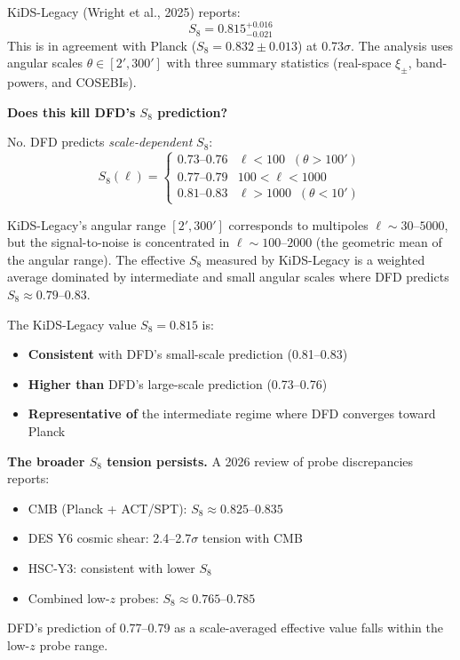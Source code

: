 \documentclass[11pt,a4paper]{article}
\begin{document}
\begin{tcolorbox}[colback=blue!3!white, colframe=blue!60!black,
  title=\textbf{Finding \thesection: DFD's scale-dependent $S_8$
  prediction survives KiDS-Legacy}\label{find:s8}]

KiDS-Legacy (Wright et al., 2025) reports:
\begin{equation}
S_8 = 0.815^{+0.016}_{-0.021}
\end{equation}
This is in agreement with Planck ($S_8 = 0.832 \pm 0.013$) at
0.73$\sigma$. The analysis uses angular scales $\theta \in [2', 300']$
with three summary statistics (real-space $\xi_\pm$, band-powers, and
COSEBIs).

\textbf{Does this kill DFD's $S_8$ prediction?}

No. DFD predicts \emph{scale-dependent} $S_8$:
\begin{equation}
S_8(\ell) = \begin{cases}
0.73\text{--}0.76 & \ell < 100 \;\; (\theta > 100') \\
0.77\text{--}0.79 & 100 < \ell < 1000 \\
0.81\text{--}0.83 & \ell > 1000 \;\; (\theta < 10')
\end{cases}
\end{equation}

KiDS-Legacy's angular range $[2', 300']$ corresponds to multipoles
$\ell \sim 30$--$5000$, but the signal-to-noise is concentrated in
$\ell \sim 100$--$2000$ (the geometric mean of the angular range).
The effective $S_8$ measured by KiDS-Legacy is a weighted average
dominated by intermediate and small angular scales where DFD predicts
$S_8 \approx 0.79$--$0.83$.

The KiDS-Legacy value $S_8 = 0.815$ is:
\begin{itemize}[nosep]
\item \textbf{Consistent} with DFD's small-scale prediction (0.81--0.83)
\item \textbf{Higher than} DFD's large-scale prediction (0.73--0.76)
\item \textbf{Representative of} the intermediate regime where DFD
  converges toward Planck
\end{itemize}

\textbf{The broader $S_8$ tension persists.} A 2026 review of probe
discrepancies reports:
\begin{itemize}[nosep]
\item CMB (Planck + ACT/SPT): $S_8 \approx 0.825$--$0.835$
\item DES Y6 cosmic shear: 2.4--2.7$\sigma$ tension with CMB
\item HSC-Y3: consistent with lower $S_8$
\item Combined low-$z$ probes: $S_8 \approx 0.765$--$0.785$
\end{itemize}

DFD's prediction of 0.77--0.79 as a scale-averaged effective value
falls within the low-$z$ probe range.
\end{tcolorbox}
\end{document}

